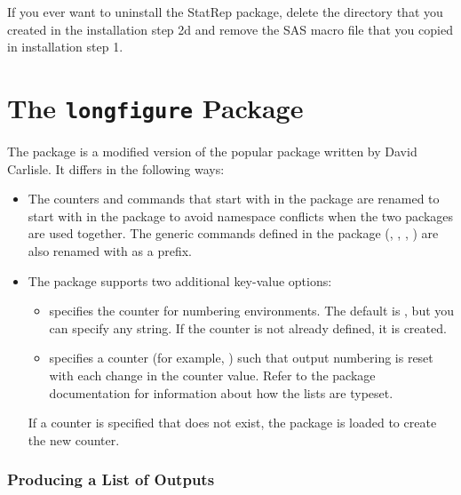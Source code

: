 \documentclass[article,oneside]{memoir}
\newcommand*{\StatRep}{\textsf{StatRep}\xspace}
\begin{document}
If you ever want to uninstall the \StatRep package,
delete the  directory that you created
in the installation step 2d and remove the SAS macro file 
that you copied in installation step 1.

\section{The \texttt{longfigure} Package}\label{longfigure}
 
  The  package is a modified version of the popular  
  package %
  written by David Carlisle. 
  It differs in the following ways:
     \begin{itemize}
     \item The counters and commands that start with  in the 
     package are renamed 
     to start with  in the  package to avoid
     namespace conflicts when the two packages are used together.  
     The generic commands defined in the  package
   (, , , ) are
   also renamed with  as a prefix.
   
     \item The  package supports two additional key-value options:
       \begin{itemize}
         \item {} specifies the counter for numbering  environments. 
         The default is , but you can specify
              any string. If the counter is not already defined,
              it is created.
       
        \item {} specifies a counter (for example, ) such
     that output numbering is reset with each change in the counter value.
     Refer to the  package documentation for information about how the 
     lists are typeset.
       \end{itemize}
       
       If a counter is specified that does not exist,
       the  package is 
       loaded to create the new counter.
         
   \end{itemize}
    \subsubsection{Producing a List of Outputs}\label{listof}
     
\end{document}
